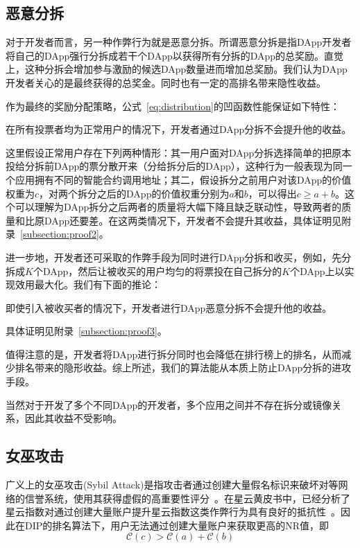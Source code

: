 \subsection{恶意分拆}
\label{subsec:5.2}

对于开发者而言，另一种作弊行为就是恶意分拆。所谓恶意分拆是指DApp开发者将自己的DApp强行分拆成若干个DApp以获得所有分拆的DApp的总奖励。直觉上，这种分拆会增加参与激励的候选DApp数量进而增加总奖励。我们认为DApp开发者关心的是最终获得的总奖金。同时也有一定的高排名带来隐性收益。

作为最终的奖励分配策略，公式~\ref{eq:distribution}的凹函数性能保证如下特性：
\begin{property}
\label{p2}
	在所有投票者均为正常用户的情况下，开发者通过DApp分拆不会提升他的收益。
\end{property}
这里假设正常用户存在下列两种情形：其一用户面对DApp分拆选择简单的把原本投给分拆前DApp的票分散开来（分给拆分后的DApp），这种行为一般表现为同一个应用拥有不同的智能合约调用地址；其二，假设拆分之前用户对该DApp的价值权重为$c$，对两个拆分之后的DApp的价值权重分别为$a$和$b$，可以得出$c \geq a+b$。这个可以理解为DApp拆分之后两者的质量将大幅下降且缺乏联动性，导致两者的质量和比原DApp还要差。在这两类情况下，开发者不会提升其收益，具体证明见附录~\ref{subsection:proof2}。

进一步地，开发者还可采取的作弊手段为同时进行DApp分拆和收买，例如，先分拆成$K$个DApp，然后让被收买的用户均匀的将票投在自己拆分的$K$个DApp上以实现效用最大化。我们有下面的推论：
\begin{corollary}
	\label{c1}
	即使引入被收买者的情况下，开发者进行DApp恶意分拆不会提升他的收益。
\end{corollary}
具体证明见附录~\ref{subsection:proof3}。

值得注意的是，开发者将DApp进行拆分同时也会降低在排行榜上的排名，从而减少排名带来的隐形收益。综上所述，我们的算法能从本质上防止DApp分拆的进攻手段。

当然对于开发了多个不同DApp的开发者，多个应用之间并不存在拆分或镜像关系，因此其收益不受影响。

\subsection{女巫攻击}
广义上的女巫攻击(Sybil Attack)是指攻击者通过创建大量假名标识来破坏对等网络的信誉系统，使用其获得虚假的高重要性评分~\cite{quercia2010sybil}。在星云黄皮书中，已经分析了星云指数对通过创建大量账户提升星云指数这类作弊行为具有良好的抵抗性~\cite{Nabulasyellowpaper}。因此在DIP的排名算法下，用户无法通过创建大量账户来获取更高的NR值，即%
$$\mathcal{C}(c)>\mathcal{C}(a)+\mathcal{C}(b)$$


